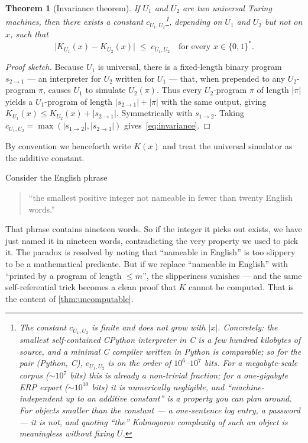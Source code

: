 \documentclass[12pt,a4paper]{article}
\theoremstyle{plain}
\newtheorem{theorem}{Theorem}[section]
\theoremstyle{definition}
\begin{document}
\begin{theorem}[Invariance theorem]
\label{thm:invariance}
If $U_1$ and $U_2$ are two universal Turing machines, then there
exists a constant $c_{U_1,U_2}$\footnote{The constant $c_{U_1,U_2}$
is finite and does not grow with $|x|$.  Concretely: the smallest
self-contained CPython interpreter in C is a few hundred kilobytes of
source, and a minimal C compiler written in Python is comparable; so
for the pair (Python, C), $c_{U_1,U_2}$ is on the order of
$10^6$--$10^7$ bits.  For a megabyte-scale corpus ($\sim\!10^7$ bits)
this is already a non-trivial fraction; for a one-gigabyte ERP export
($\sim\!10^{10}$ bits) it is numerically negligible, and
``machine-independent up to an additive constant'' is a property you
can plan around.  For objects \emph{smaller} than the constant --- a
one-sentence log entry, a password --- it is not, and quoting ``the''
Kolmogorov complexity of such an object is meaningless without fixing
$U$.}, depending on $U_1$ and $U_2$ but not on $x$, such that
\begin{equation}
  \bigl| K_{U_1}(x) - K_{U_2}(x) \bigr| \;\le\; c_{U_1,U_2}
  \quad \text{for every } x \in \{0,1\}^*.
  \label{eq:invariance}
\end{equation}
\end{theorem}

\begin{proof}[Proof sketch]
Because $U_1$ is universal, there is a fixed-length binary program
$s_{2\to 1}$ --- an interpreter for $U_2$ written for $U_1$ --- that,
when prepended to any $U_2$-program $\pi$, causes $U_1$ to simulate
$U_2(\pi)$.  Thus every $U_2$-program $\pi$ of length $|\pi|$ yields a
$U_1$-program of length $|s_{2\to 1}| + |\pi|$ with the same output,
giving $K_{U_1}(x) \le K_{U_2}(x) + |s_{2\to 1}|$.  Symmetrically with
$s_{1\to 2}$.  Taking $c_{U_1,U_2} = \max(|s_{1\to 2}|, |s_{2\to 1}|)$
gives~\eqref{eq:invariance}.
\end{proof}

By convention we henceforth write $K(x)$ and treat the universal
simulator as the additive constant.

\begin{intuition}[title={The Berry paradox, dramatised}]
Consider the English phrase
\begin{quote}
``the smallest positive integer not nameable in fewer than twenty
English words.''
\end{quote}
That phrase contains nineteen words.  So if the integer it picks out
exists, we have just named it in nineteen words, contradicting the
very property we used to pick it.  The paradox is resolved by noting
that ``nameable in English'' is too slippery to be a mathematical
predicate.  But if we replace ``nameable in English'' with ``printed
by a program of length $\le m$'', the slipperiness vanishes --- and
the same self-referential trick becomes a clean proof that $K$ cannot
be computed.  That is the content of \cref{thm:uncomputable}.
\end{intuition}
\end{document}
